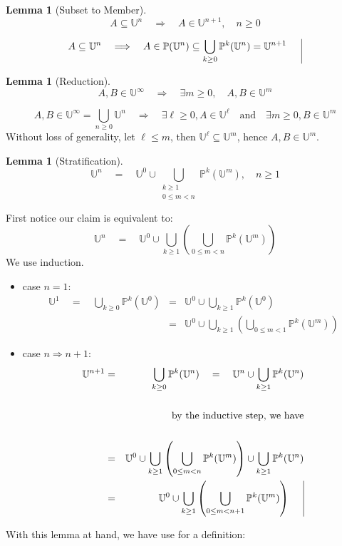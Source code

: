 \documentclass[twoside]{article}
\newcommand{\powerset}[2][P]{\ensuremath{\mathbb{#1}(#2)}}
\newcommand{\nthps}[2][P]{\ensuremath{\mathbb{#1}^{#2}}}
\newcommand{\nthus}[2][U]{\ensuremath{\mathbb{#1}^{#2}}}
\newcommand{\psunion}[2][P]{\ensuremath{\bigcup_{#2\ge 0}\mathbb{#1}^{#2}}}
\newcommand{\opsunion}[3][P]{\ensuremath{\bigcup_{#2\ge #3}\mathbb{#1}^{#2}}}
\newcommand{\usunion}[2][U]{\ensuremath{\bigcup_{#2\ge 0}\mathbb{#1}^{#2}}}
\newcommand{\stratified}{\ensuremath{\mathbb{U}^\infty}}
\newcommand{\then}{\ensuremath{\quad\Longrightarrow\quad}}
\newcommand{\equals}{\ensuremath{\quad =\quad}}
\newtheorem{lemma}[theorem]{Lemma}
\newenvironment{proof}[1][Proof]{\begin{trivlist}
\item[\hskip \labelsep {\bfseries #1}]}{\end{trivlist}}
\newcommand{\qed}{\nobreak \ifvmode \relax \else
      \ifdim\lastskip<1.5em \hskip-\lastskip
      \hskip1.5em plus0em minus0.5em \fi \nobreak
      \vrule height0.75em width0.5em depth0.25em\fi}
\begin{document}
\begin{lemma}[Subset to Member]
$$ A\subseteq\nthus{n}\then A\in\nthus{n+1},\quad n\ge 0 $$
\end{lemma}

\begin{proof}
$$ A\subseteq\nthus{n}\then A\in\powerset{\nthus{n}}\subseteq\psunion{k}(\nthus{n})=\nthus{n+1}\qed $$
\end{proof}

\begin{lemma}[Reduction]
$$ A,B\in\stratified\then\exists m\ge 0,\quad A,B\in\nthus{m} $$
\end{lemma}

\begin{proof}
$$ A,B\in\stratified=\usunion{n}\then\exists \ell\ge 0, A\in\nthus{\ell}\quad\mbox{and}\quad\exists m\ge 0, B\in\nthus{m} $$
Without loss of generality, let $ \ell\le m $, then $ \nthus{\ell}\subseteq\nthus{m} $, hence $ A,B\in\nthus{m} $.\qed
\end{proof}

\begin{lemma}[Stratification]
$$ \nthus{n}\equals\nthus{0}\cup\bigcup_{\substack{k\ge 1 \\ 0\le m < n}}\nthps{k}(\nthus{m}),\quad n\ge 1 $$
\end{lemma}

\begin{proof}
First notice our claim is equivalent to:
$$ \nthus{n}\equals\nthus{0}\cup\bigcup_{k\ge 1}\left(\bigcup_{0\le m < n}\nthps{k}(\nthus{m})\right) $$
We use induction.
\begin{itemize}
\item case $ n=1 $:
\begin{eqnarray*}
\nthus{1}\equals\psunion{k}(\nthus{0}) & = & \nthus{0}\cup\opsunion{k}{1}(\nthus{0}) \\
 & = & \nthus{0}\cup\bigcup_{k\ge 1}\left(\bigcup_{0\le m < 1}\nthps{k}(\nthus{m})\right)
\end{eqnarray*}
\item case $ n\Longrightarrow n+1 $:
\begin{eqnarray*}
\nthus{n+1} & = & \psunion{k}(\nthus{n})\equals\nthus{n}\cup\opsunion{k}{1}(\nthus{n}) \\
 & & \\
 & & \mbox{by the inductive step, we have} \\
 & & \\
 & = & \nthus{0}\cup\bigcup_{k\ge 1}\left(\bigcup_{0\le m < n}\nthps{k}(\nthus{m})\right)\cup\opsunion{k}{1}(\nthus{n}) \\
 & = & \nthus{0}\cup\bigcup_{k\ge 1}\left(\bigcup_{0\le m < n+1}\nthps{k}(\nthus{m})\right)\qed
\end{eqnarray*}
\end{itemize}
\end{proof}
With this lemma at hand, we have use for a definition:
\end{document}

